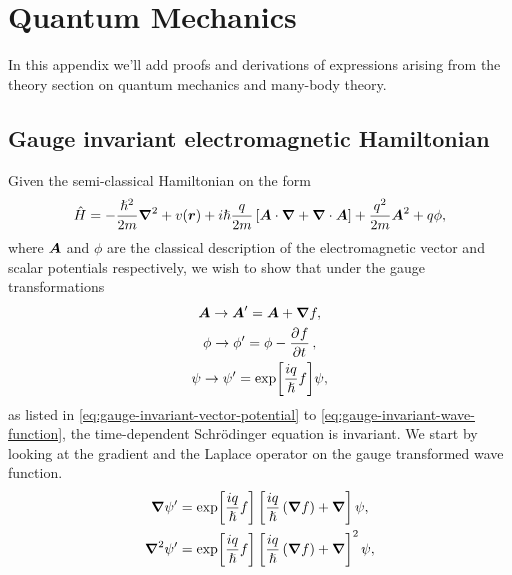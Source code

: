 \chapter{Quantum Mechanics}
    In this appendix we'll add proofs and derivations of expressions arising
    from the theory section on quantum mechanics and many-body theory.

    \section{Gauge invariant electromagnetic Hamiltonian}
        \label{app:gauge-invariant-electromagnetic-hamiltonian}
        Given the semi-classical Hamiltonian on the form
        \begin{align}
            \hat{H}
            = -\frac{\hslash^2}{2m}\boldsymbol{\nabla}^2
            + v(\boldsymbol{r})
            + i\hslash\frac{q}{2m}\left[ 
                \boldsymbol{A}\cdot\boldsymbol{\nabla}
                + \boldsymbol{\nabla}\cdot\boldsymbol{A}
             \right]
            + \frac{q^2}{2m}\boldsymbol{A}^2
            + q\phi,
        \end{align}
        where $\boldsymbol{A}$ and $\phi$ are the classical description of the
        electromagnetic vector and scalar potentials respectively, we wish to
        show that under the gauge transformations
        \begin{gather}
            \vfg{A} \to \vfg{A}' = \vfg{A} + \vfg{\nabla}f,
            \\
            \phi \to \phi' = \phi - \dpd{f}{t},
            \\
            \psi \to \psi' = \exp[\frac{iq}{\hslash}f]\psi,
        \end{gather}
        as listed in \autoref{eq:gauge-invariant-vector-potential} to
        \autoref{eq:gauge-invariant-wave-function}, the time-dependent
        Schrödinger equation is invariant.
        We start by looking at the gradient and the Laplace operator on the
        gauge transformed wave function.
        \begin{gather}
            \boldsymbol{\nabla}\psi'
            = \exp[\frac{iq}{\hslash} f]\left[ 
                \frac{iq}{\hslash}\left( \boldsymbol{\nabla}f \right)
                + \boldsymbol{\nabla}
             \right]\psi, \\
            \boldsymbol{\nabla}^2\psi'
            = \exp[\frac{iq}{\hslash} f]\left[ 
                \frac{iq}{\hslash}\left( \boldsymbol{\nabla}f \right)
                + \boldsymbol{\nabla}
             \right]^2\psi, \\
        \end{gather}
